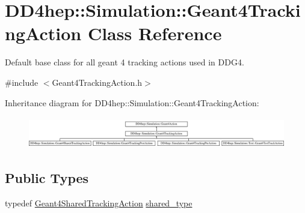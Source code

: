 \hypertarget{class_d_d4hep_1_1_simulation_1_1_geant4_tracking_action}{}\section{D\+D4hep\+:\+:Simulation\+:\+:Geant4\+Tracking\+Action Class Reference}
\label{class_d_d4hep_1_1_simulation_1_1_geant4_tracking_action}


Default base class for all geant 4 tracking actions used in D\+D\+G4.  




{\ttfamily \#include $<$Geant4\+Tracking\+Action.\+h$>$}

Inheritance diagram for D\+D4hep\+:\+:Simulation\+:\+:Geant4\+Tracking\+Action\+:\begin{figure}[H]
\begin{center}
\leavevmode
\includegraphics[height=1.395349cm]{class_d_d4hep_1_1_simulation_1_1_geant4_tracking_action}
\end{center}
\end{figure}
\subsection*{Public Types}
\begin{DoxyCompactItemize}
\item 
typedef \hyperlink{class_d_d4hep_1_1_simulation_1_1_geant4_shared_tracking_action}{Geant4\+Shared\+Tracking\+Action} \hyperlink{class_d_d4hep_1_1_simulation_1_1_geant4_tracking_action_af42e74e119918be4046770f69c8c0266}{shared\+\_\+type}
\end{DoxyCompactItemize}
